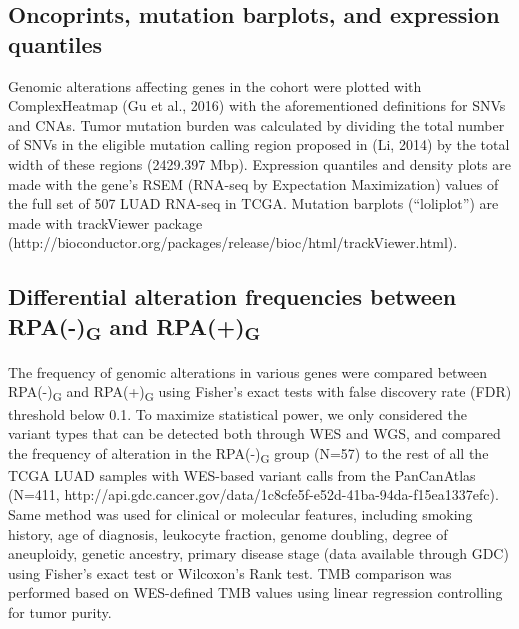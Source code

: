 \documentclass[phd,tocprelim]{cornell}
\begin{document}
\subsection*{Oncoprints, mutation barplots, and expression quantiles}
Genomic alterations affecting genes in the cohort were plotted with ComplexHeatmap (Gu et al., 2016) with the aforementioned definitions for SNVs and CNAs. Tumor mutation burden was calculated by dividing the total number of SNVs in the eligible mutation calling region proposed in (Li, 2014) by the total width of these regions (2429.397 Mbp). Expression quantiles and density plots are made with the gene’s RSEM (RNA-seq by Expectation Maximization) values of the full set of 507 LUAD RNA-seq in TCGA. Mutation barplots (“loliplot”) are made with trackViewer package (http://bioconductor.org/packages/release/bioc/html/trackViewer.html).

\subsection*{Differential alteration frequencies between RPA(-)\textsubscript{G} and RPA(+)\textsubscript{G}}
The frequency of genomic alterations in various genes were compared between RPA(-)\textsubscript{G} and RPA(+)\textsubscript{G} using Fisher’s exact tests with false discovery rate (FDR) threshold below 0.1. To maximize statistical power, we only considered the variant types that can be detected both through WES and WGS, and compared the frequency of alteration in the RPA(-)\textsubscript{G} group (N=57) to the rest of all the TCGA LUAD samples with WES-based variant calls from the PanCanAtlas (N=411, http://api.gdc.cancer.gov/data/1c8cfe5f-e52d-41ba-94da-f15ea1337efc). Same method was used for clinical or molecular features, including smoking history, age of diagnosis, leukocyte fraction, genome doubling, degree of aneuploidy, genetic ancestry, primary disease stage (data available through GDC) using Fisher’s exact test or Wilcoxon’s Rank test. TMB comparison was performed based on WES-defined TMB values using linear regression controlling for tumor purity.
\end{document}
